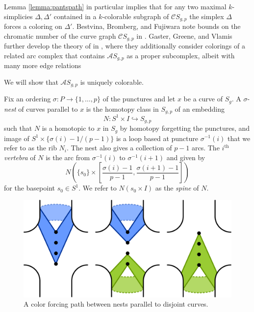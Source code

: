 \begin{remark}
Lemma \ref{lemma:pantspath}
in particular implies that for any two maximal $k$-simplicies
$\Delta,\Delta'$ contained in a $k$-colorable subgraph of $\mathcal C S_{g,p}$
the simplex $\Delta$ forces a coloring on $\Delta'$.
Bestvina, Bromberg, and Fujiwara note bounds on the chromatic number of the curve graph $\mathcal C S_{g,p}$
in \cite{MR3415065}.
Gaster, Greene, and Vlamis further develop the theory of  in \cite{2016arXiv160801589G}, where they additionally consider colorings of
a related arc complex that contains $\mathcal A S_{g,p}$ as a proper subcomplex, albeit with many more edge relations
\end{remark}

We will show that $\mathcal A S_{g,p}$ is uniquely colorable.


\begin{definition}
  \label{def:nest}
Fix an ordering $\sigma:P \to \{1,\ldots,p\}$ of the punctures
and let $x$ be a curve of $S_g$.
A $\sigma$-\emph{nest} of curves parallel to $x$
is the homotopy class in $S_{g,p}$
of an embedding
$$N: S^1 \times I \hookrightarrow S_{g,p}$$
such that $N$ is a homotopic to $x$ in $S_g$ by homotopy forgetting the punctures,
and image of $S^1 \times \{{\sigma(i)-1}/{(p-1)}\}$ is a loop based at puncture $\sigma^{-1}(i)$
that we refer to as the rib $N_i$.
The nest also gives a collection of $p-1$ arcs.
The  $i^{\mbox{th}}$ \emph{vertebra} of $N$ is the arc from $\sigma^{-1}(i)$ to $\sigma^{-1}(i+1)$ and given by
$$
N \left ( \{s_0\}\times  \left [ \frac{\sigma(i)-1}{p-1}, \frac{\sigma(i+1)-1}{p-1} \right]  \right )
$$
for the basepoint $s_0 \in S^1$.
We refer to $N(s_0 \times I)$ as the \emph{spine} of $N$.
\end{definition}


\begin{figure}[h!]
  \centering
  \includegraphics[width=.7\textwidth]{figures/corset.pdf}
  \caption{A color forcing path between nests parallel to disjoint curves.}
  \label{fig:corset}
\end{figure}


